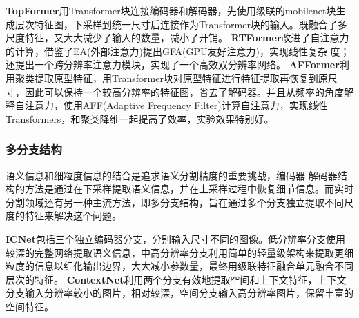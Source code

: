 \documentclass[11pt]{article}
\begin{document}
\textbf{TopFormer}\cite{ref29}用Transformer块连接编码器和解码器，先使用级联的mobilenet块生成层次特征图，下采样到统一尺寸后连接作为Transformer块的输入。既融合了多尺度特征，又大大减少了输入的数量，减小了开销。
\textbf{RTFormer}\cite{ref30}改进了自注意力的计算，借鉴了EA(外部注意力)提出GFA(GPU友好注意力)，实现线性复杂
度；还提出一个跨分辨率注意力模块，实现了一个高效双分辨率网络。
\textbf{AFFormer}\cite{aff}利用聚类提取原型特征，用Transformer块对原型特征进行特征提取再恢复到原尺寸，因此可以保持一个较高分辨率的特征图，省去了解码器。并且从频率的角度解释自注意力，使用AFF(Adaptive Frequency Filter)计算自注意力，实现线性Transformers，和聚类降维一起提高了效率，实验效果特别好。

\subsubsection{多分支结构}
语义信息和细粒度信息的结合是追求语义分割精度的重要挑战，编码器-解码器结构的方法是通过在下采样提取语义信息，并在上采样过程中恢复细节信息。而实时分割领域还有另一种主流方法，即多分支结构，旨在通过多个分支独立提取不同尺度的特征来解决这个问题。

\textbf{ICNet}\cite{ref31}包括三个独立编码器分支，分别输入尺寸不同的图像。低分辨率分支使用较深的完整网络提取语义信息，中高分辨率分支利用简单的轻量级架构来提取更细粒度的信息以细化输出边界，大大减小参数量，最终用级联特征融合单元融合不同层次的特征。
\textbf{ContextNet}\cite{ref32}利用两个分支有效地提取空间和上下文特征，上下文分支输入分辨率较小的图片，相对较深，空间分支输入高分辨率图片，保留丰富的空间特征。
\end{document}
